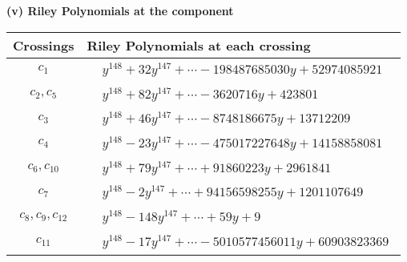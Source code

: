 \documentclass[1p]{elsarticle_modified}
\theoremstyle{definition}
\begin{document}
\newpage\renewcommand{\arraystretch}{1}
\flushleft \textbf{(v) Riley Polynomials at the component}\newline \\
\begin{tabular}{m{50pt}|m{274pt}}
Crossings & \hspace{64pt}Riley Polynomials at each crossing \\
\hline $$\begin{aligned}c_{1}\end{aligned}$$&$\begin{aligned}
&y^{148}+32 y^{147}+\cdots-198487685030 y+52974085921
\end{aligned}$\\
\hline $$\begin{aligned}c_{2},c_{5}\end{aligned}$$&$\begin{aligned}
&y^{148}+82 y^{147}+\cdots-3620716 y+423801
\end{aligned}$\\
\hline $$\begin{aligned}c_{3}\end{aligned}$$&$\begin{aligned}
&y^{148}+46 y^{147}+\cdots-8748186675 y+13712209
\end{aligned}$\\
\hline $$\begin{aligned}c_{4}\end{aligned}$$&$\begin{aligned}
&y^{148}-23 y^{147}+\cdots-475017227648 y+14158858081
\end{aligned}$\\
\hline $$\begin{aligned}c_{6},c_{10}\end{aligned}$$&$\begin{aligned}
&y^{148}+79 y^{147}+\cdots+91860223 y+2961841
\end{aligned}$\\
\hline $$\begin{aligned}c_{7}\end{aligned}$$&$\begin{aligned}
&y^{148}-2 y^{147}+\cdots+94156598255 y+1201107649
\end{aligned}$\\
\hline $$\begin{aligned}c_{8},c_{9},c_{12}\end{aligned}$$&$\begin{aligned}
&y^{148}-148 y^{147}+\cdots+59 y+9
\end{aligned}$\\
\hline $$\begin{aligned}c_{11}\end{aligned}$$&$\begin{aligned}
&y^{148}-17 y^{147}+\cdots-5010577456011 y+60903823369
\end{aligned}$\\
\hline
\end{tabular}\\~\\
\end{document}
